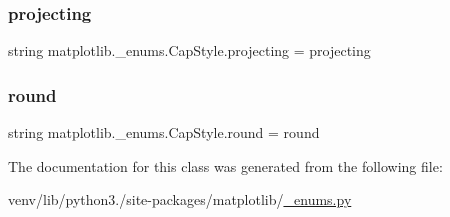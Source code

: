 \subsubsection{\texorpdfstring{projecting}{projecting}}
{\footnotesize\ttfamily string matplotlib.\+\_\+enums.\+Cap\+Style.\+projecting = \textquotesingle{}projecting\textquotesingle{}\hspace{0.3cm}{\ttfamily [static]}}

\mbox{\label{classmatplotlib_1_1__enums_1_1CapStyle_af45ce87bc3be83f04d5985486de98fd6}} 
\subsubsection{\texorpdfstring{round}{round}}
{\footnotesize\ttfamily string matplotlib.\+\_\+enums.\+Cap\+Style.\+round = \textquotesingle{}round\textquotesingle{}\hspace{0.3cm}{\ttfamily [static]}}



The documentation for this class was generated from the following file\+:\begin{DoxyCompactItemize}
\item 
venv/lib/python3./site-\/packages/matplotlib/\hyperlink{__enums_8py}{\+\_\+enums.\+py}\end{DoxyCompactItemize}

